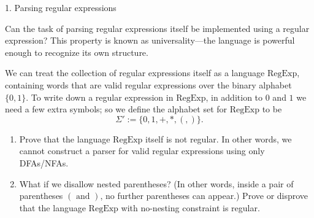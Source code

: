 \documentclass[12pt]{article}
\begin{document}


\begin{problem}{1. Parsing regular expressions}

Can the task of parsing regular expressions itself be implemented using a regular expression? This property is known as universality—the language is powerful enough to recognize its own structure.

We can treat the collection of regular expressions itself as a language $\mathrm{RegExp}$, containing words that are valid regular expressions over the binary alphabet $\{0,1\}$. To write down a regular expression in $\mathrm{RegExp}$, in addition to $0$ and $1$ we need a few extra symbols; so we define the alphabet set for $\mathrm{RegExp}$ to be
\[
\Sigma' := \{0,1,+,*,(,)\}.
\]

\begin{enumerate}
    \item[(a)] Prove that the language $\mathrm{RegExp}$ itself is not regular. In other words, we cannot construct a parser for valid regular expressions using only DFAs/NFAs.
    
    \item[(b)] What if we disallow nested parentheses? (In other words, inside a pair of parentheses $( \text{ and } )$, no further parentheses can appear.) Prove or disprove that the language $\mathrm{RegExp}$ with no-nesting constraint is regular.
\end{enumerate}
\end{problem}
\end{document}
